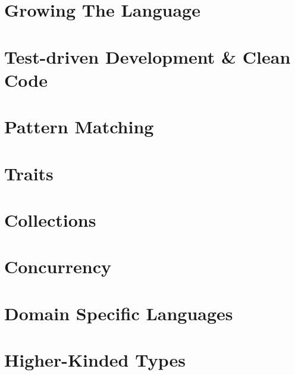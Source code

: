 \part[Growing The Language]{Growing The Language}
\part[TDD \& Clean Code]{Test-driven Development \& Clean Code}
\part[Pattern Matching]{Pattern Matching}
\part[Traits]{Traits}
\part[Collections]{Collections}
\part[Concurrency]{Concurrency}
\part[DSLs]{Domain Specific Languages}
\part[Higher-Kinded Types]{Higher-Kinded Types}